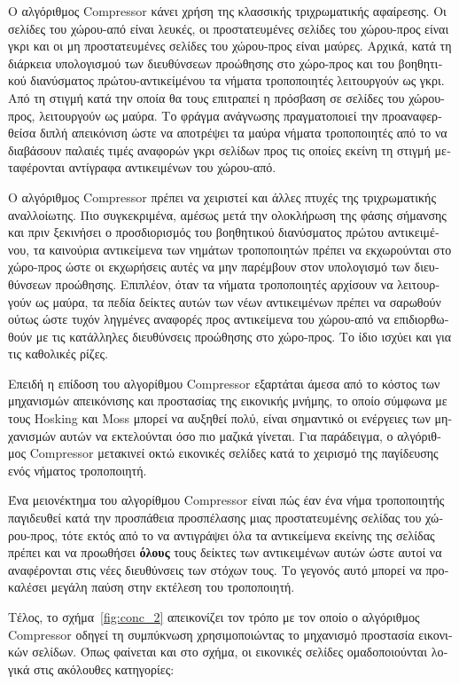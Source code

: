 \begin{greek}
Ο αλγόριθμος Compressor κάνει χρήση της κλασσικής τριχρωματικής
αφαίρεσης. Οι σελίδες του χώρου-από είναι λευκές, οι προστατευμένες
σελίδες του χώρου-προς είναι γκρι και οι μη προστατευμένες σελίδες
του χώρου-προς είναι μαύρες. Αρχικά, κατά τη διάρκεια υπολογισμού
των διευθύνσεων προώθησης στο χώρο-προς και του βοηθητικού διανύσματος
πρώτου-αντικείμένου τα νήματα τροποποιητές λειτουργούν ως γκρι.
Από τη στιγμή κατά την οποία θα τους επιτραπεί η πρόσβαση σε
σελίδες του χώρου-προς, λειτουργούν ως μαύρα. Το φράγμα ανάγνωσης
πραγματοποιεί την προαναφερθείσα διπλή απεικόνιση ώστε να αποτρέψει
τα μαύρα νήματα τροποποιητές από το να διαβάσουν παλαιές τιμές
αναφορών γκρι σελίδων προς τις οποίες εκείνη τη στιγμή μεταφέρονται
αντίγραφα αντικειμένων του χώρου-από.

Ο αλγόριθμος Compressor πρέπει να χειριστεί και άλλες πτυχές
της τριχρωματικής αναλλοίωτης. Πιο συγκεκριμένα, αμέσως μετά
την ολοκλήρωση της φάσης σήμανσης και πριν ξεκινήσει ο
προσδιορισμός του βοηθητικού διανύσματος πρώτου αντικειμένου,
τα καινούρια αντικείμενα των νημάτων τροποποιητών πρέπει
να εκχωρούνται στο χώρο-προς ώστε οι εκχωρήσεις αυτές να
μην παρέμβουν στον υπολογισμό των διευθύνσεων προώθησης.
Επιπλέον, όταν τα νήματα τροποποιητές αρχίσουν να λειτουργούν
ως μαύρα, τα πεδία δείκτες αυτών των νέων αντικειμένων πρέπει
να σαρωθούν ούτως ώστε τυχόν ληγμένες αναφορές προς αντικείμενα
του χώρου-από να επιδιορθωθούν με τις κατάλληλες διευθύνσεις
προώθησης στο χώρο-προς. Το ίδιο ισχύει και για τις καθολικές
ρίζες.

Επειδή η επίδοση του αλγορίθμου Compressor εξαρτάται άμεσα
από το κόστος των μηχανισμών απεικόνισης και προστασίας της
εικονικής μνήμης, το οποίο σύμφωνα με τους Hosking και Moss
\cite{DBLP:conf/sosp/HoskingM93} μπορεί να αυξηθεί πολύ, είναι
σημαντικό οι ενέργειες των μηχανισμών αυτών να εκτελούνται
όσο πιο μαζικά γίνεται. Για παράδειγμα, ο αλγόριθμος Compressor
μετακινεί οκτώ εικονικές σελίδες κατά το χειρισμό της παγίδευσης
ενός νήματος τροποποιητή. 

Ένα μειονέκτημα του αλγορίθμου Compressor είναι πώς έαν ένα
νήμα τροποποιητής παγιδευθεί κατά την προσπάθεια προσπέλασης
μιας προστατευμένης σελίδας του χώρου-προς, τότε εκτός από
το να αντιγράψει όλα τα αντικείμενα εκείνης της σελίδας πρέπει
και να προωθήσει \textbf{όλους} τους δείκτες των αντικειμένων
αυτών ώστε αυτοί να αναφέρονται στις νέες διευθύνσεις των
στόχων τους. Το γεγονός αυτό μπορεί να προκαλέσει μεγάλη
παύση στην εκτέλεση του τροποποιητή.

Τέλος, το σχήμα~\ref{fig:conc_2} απεικονίζει τον τρόπο με τον
οποίο ο αλγόριθμος Compressor οδηγεί τη συμπύκνωση χρησιμοποιώντας
το μηχανισμό προστασία εικονικών σελίδων. Όπως φαίνεται
και στο σχήμα, οι εικονικές σελίδες ομαδοποιούνται λογικά
στις ακόλουθες κατηγορίες:


\end{greek}
